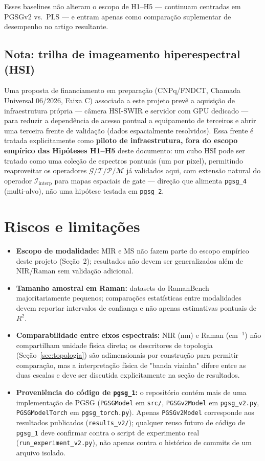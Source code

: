\documentclass[11pt,a4paper]{article}
\begin{document}
Esses baselines não alteram o escopo de H1--H5 --- continuam centradas em PGSGv2 vs.\ PLS --- e entram apenas como comparação suplementar de desempenho no artigo resultante.

\subsection{Nota: trilha de imageamento hiperespectral (HSI)}
\label{sec:hsi-nota}

Uma proposta de financiamento em preparação (CNPq/FNDCT, Chamada Universal 06/2026, Faixa C) associada a este projeto prevê a aquisição de infraestrutura própria --- câmera HSI-SWIR e servidor com GPU dedicado --- para reduzir a dependência de acesso pontual a equipamento de terceiros e abrir uma terceira frente de validação (dados espacialmente resolvidos). Essa frente é tratada explicitamente como \textbf{piloto de infraestrutura, fora do escopo empírico das Hipóteses H1--H5} deste documento: um cubo HSI pode ser tratado como uma coleção de espectros pontuais (um por pixel), permitindo reaproveitar os operadores $\mathcal{G}/\mathcal{T}/\mathcal{P}/\mathcal{M}$ já validados aqui, com extensão natural do operador $\mathcal{I}_{\text{interp}}$ para mapas espaciais de gate --- direção que alimenta \texttt{pgsg\_4} (multi-alvo), não uma hipótese testada em \texttt{pgsg\_2}.

\section{Riscos e limitações}

\begin{itemize}
\item \textbf{Escopo de modalidade:} MIR e MS não fazem parte do escopo empírico deste projeto (Seção~2); resultados não devem ser generalizados além de NIR/Raman sem validação adicional.
\item \textbf{Tamanho amostral em Raman:} datasets do RamanBench majoritariamente pequenos; comparações estatísticas entre modalidades devem reportar intervalos de confiança e não apenas estimativas pontuais de $R^2$.
\item \textbf{Comparabilidade entre eixos espectrais:} NIR (nm) e Raman (cm$^{-1}$) não compartilham unidade física direta; os descritores de topologia (Seção~\ref{sec:topologia}) são adimensionais por construção para permitir comparação, mas a interpretação física de "banda vizinha" difere entre as duas escalas e deve ser discutida explicitamente na seção de resultados.
\item \textbf{Proveniência do código de \texttt{pgsg\_1}:} o repositório contém mais de uma implementação de PGSG (\texttt{PGSGModel} em \texttt{src/}, \texttt{PGSGv2Model} em \texttt{pgsg\_v2.py}, \texttt{PGSGModelTorch} em \texttt{pgsg\_torch.py}). Apenas \texttt{PGSGv2Model} corresponde aos resultados publicados (\texttt{results\_v2/}); qualquer reuso futuro de código de \texttt{pgsg\_1} deve confirmar contra o script de experimento real (\texttt{run\_experiment\_v2.py}), não apenas contra o histórico de commits de um arquivo isolado.
\end{itemize}
\end{document}
